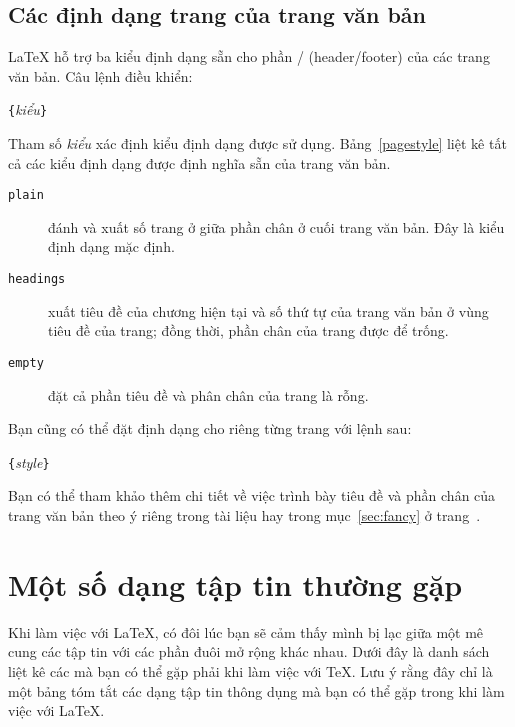 \subsection{Các định dạng trang của trang văn bản}
\LaTeX{} hỗ trợ ba kiểu định dạng sẵn cho phần  /  (header/footer) của các trang văn bản. Câu lệnh điều khiển:
\begin{lscommand}
\verb|{|\emph{kiểu}\verb|}|
\end{lscommand}
\noindent Tham số \emph{kiểu} xác định kiểu định dạng được sử dụng. Bảng~\ref{pagestyle} liệt kê tất cả các kiểu định dạng được định nghĩa sẵn của trang văn bản.

\begin{table}[!thbp]
\caption{Các kiểu định dạng sẵn của trang văn bản trong \LaTeX.}
\label{pagestyle}
\begin{lined}{12cm}
\begin{description}

\item[\normalfont\texttt{plain}]  đánh và xuất số trang ở giữa phần chân ở cuối trang văn bản. Đây là kiểu định dạng mặc định.

\item[\normalfont\texttt{headings}] xuất tiêu đề của chương hiện tại và số thứ tự của trang văn bản ở vùng tiêu đề của trang; đồng thời, phần chân của trang được để trống.

\item[\normalfont\texttt{empty}] đặt cả phần tiêu đề và phân chân của trang là rỗng.

\end{description}
\end{lined}
\end{table}

Bạn cũng có thể đặt định dạng cho riêng từng trang với lệnh sau:
\begin{lscommand}
\verb|{|\emph{style}\verb|}|
\end{lscommand}

Bạn có thể tham khảo thêm chi tiết về việc trình bày tiêu đề và phần chân của trang văn bản theo ý riêng trong tài liệu
\companion{} hay trong mục~\ref{sec:fancy} ở trang~\pageref{sec:fancy}.

\section{Một số dạng tập tin thường gặp}
Khi làm việc với \LaTeX{}, có đôi lúc bạn sẽ cảm thấy mình bị lạc giữa một mê cung các tập tin với các phần đuôi mở rộng khác nhau. Dưới đây là danh sách liệt kê các  mà bạn có thể gặp phải khi làm việc với \TeX{}. Lưu ý rằng đây chỉ là một bảng tóm tắt các dạng tập tin thông dụng mà bạn có thể gặp trong khi làm việc với \LaTeX{}.

